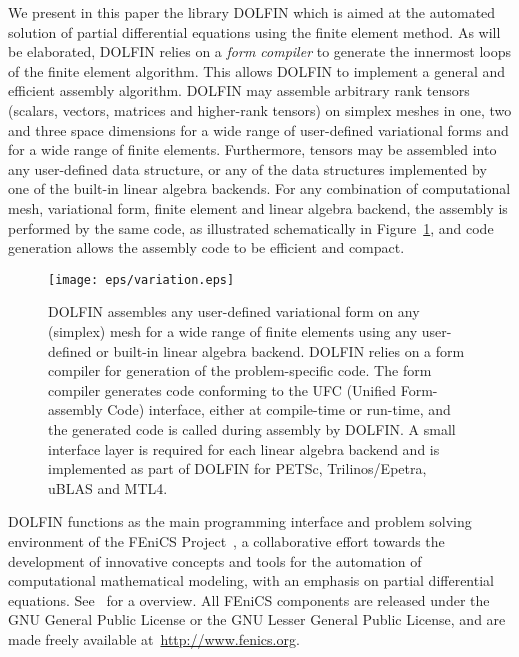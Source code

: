 \documentclass[acmtoms]{acmtrans2m}
\newcommand{\dolfin}{DOLFIN}
\newcommand{\fenics}{FEniCS}
\begin{document}
We present in this paper the library \dolfin{} which is aimed at the
automated solution of partial differential equations using the finite
element method.  As will be elaborated, \dolfin{} relies on a
\emph{form compiler} to generate the innermost loops of the finite
element algorithm. This allows \dolfin{} to implement a general and
efficient assembly algorithm. \dolfin{} may assemble arbitrary rank
tensors (scalars, vectors, matrices and higher-rank tensors) on
simplex meshes in one, two and three space dimensions for a wide
range of user-defined variational forms and for a wide range of
finite elements. Furthermore, tensors may
be assembled into any user-defined data structure, or any of the data
structures implemented by one of the built-in linear algebra backends.
For any combination of computational mesh, variational form, finite
element and linear algebra backend, the assembly is performed by the
same code, as illustrated schematically in Figure~\ref{fig:variation},
and code generation allows the assembly code to be efficient and
compact.
\begin{figure}
  \begin{center}
    \texttt{[image: eps/variation.eps]}
    \caption{\dolfin{} assembles any user-defined variational form on
      any (simplex) mesh for a wide range of finite elements using any
      user-defined or built-in linear algebra backend. \dolfin{}
      relies on a form compiler for generation of the problem-specific
      code. The form compiler generates code conforming to the UFC
      (Unified Form-assembly Code) interface, either at compile-time
      or run-time, and the generated code is called during assembly by
      \dolfin{}. A small interface layer is required for each linear
      algebra backend and is implemented as part of \dolfin{} for
      PETSc, Trilinos/Epetra, uBLAS and MTL4.}
    \label{fig:variation}
  \end{center}
\end{figure}

\dolfin{} functions as the main programming interface and problem
solving environment of the \fenics{} Project~\cite{fenics:www}, a
collaborative effort towards the development of innovative concepts
and tools for the automation of computational mathematical modeling,
with an emphasis on partial differential equations.
See~ for a overview.
All \fenics{}
components are released under the GNU General Public License or the
GNU Lesser General Public License, and are made freely available
at~\url{http://www.fenics.org}.
\end{document}
